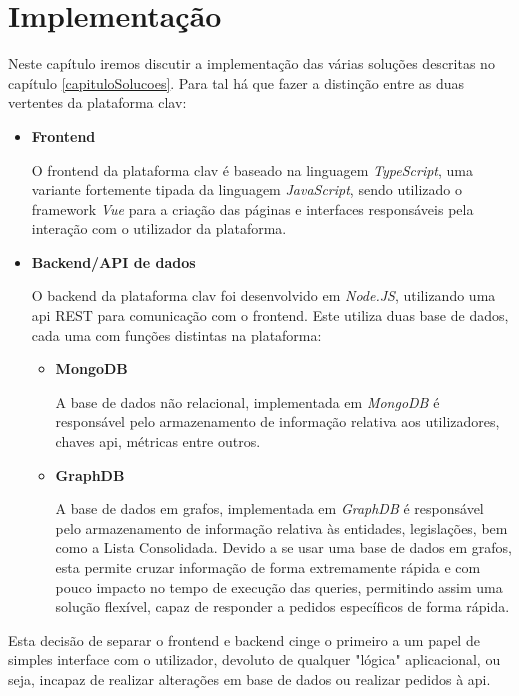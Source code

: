 \chapter{Implementação} \label{implementacao}

Neste capítulo iremos discutir a implementação das várias soluções descritas no capítulo \ref{capituloSolucoes}. Para tal há que fazer a distinção entre as duas vertentes da plataforma \gls{clav}:

\begin{itemize}
    \item \textbf{Frontend}
    
    O frontend da plataforma \gls{clav} é baseado na linguagem \emph{TypeScript}, uma variante fortemente tipada da linguagem \emph{JavaScript}, sendo utilizado o framework \emph{Vue} para a criação das páginas e interfaces responsáveis pela interação com o utilizador da plataforma.
    
    \item \textbf{Backend/API de dados}
    
    O backend da plataforma \gls{clav} foi desenvolvido em \emph{Node.JS}, utilizando uma \gls{api} REST para comunicação com o frontend. Este utiliza duas base de dados, cada uma com funções distintas na plataforma:
    
    \begin{itemize}
        \item \textbf{MongoDB}
        
        A base de dados não relacional, implementada em \emph{MongoDB} é responsável pelo armazenamento de informação relativa aos utilizadores, chaves \gls{api}, métricas entre outros.
        
        \item \textbf{GraphDB}
        
        A base de dados em grafos, implementada em \emph{GraphDB} é responsável pelo armazenamento de informação relativa às entidades, legislações, bem como a Lista Consolidada. Devido a se usar uma base de dados em grafos, esta permite cruzar informação de forma extremamente rápida e com pouco impacto no tempo de execução das queries, permitindo assim uma solução flexível, capaz de responder a pedidos específicos de forma rápida.
    \end{itemize}
\end{itemize}

Esta decisão de separar o frontend e backend cinge o primeiro a um papel de simples interface com o utilizador, devoluto de qualquer "lógica" aplicacional, ou seja, incapaz de realizar alterações em base de dados ou realizar pedidos à \gls{api}. 

